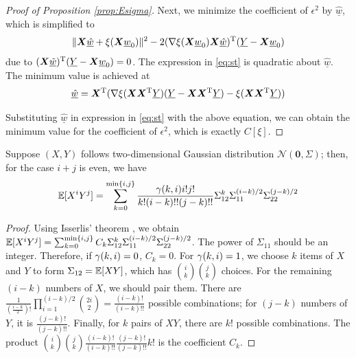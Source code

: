 \documentclass[appliedmath,article,accept,pdftex,moreauthors]{Definitions/mdpi}
\begin{document}
\begin{proof}[Proof of Proposition \ref{prop:Esigma}]
Next, we minimize the coefficient of $\epsilon^2$ by $\underline{\hat{w}}$, which is simplified to 
\begin{equation}\label{eq:st}
\lVert\bm{X}\underline{\hat{w}} + \xi(\bm{X} \underline{w}_0)\rVert^2-
2 (
\nabla \xi(\bm{X} \underline{w}_0)\bm{X}\underline{\hat{w}})^{\mathrm{T}}(\underline{Y}-\bm{X} \underline{w}_0)
\end{equation}
due to $(\bm{X}\underline{\tilde{w}})^{\mathrm{T}} (\underline{Y}-\bm{X}\underline{w}_0) = 0 $.
The expression in \eqref{eq:st} is quadratic about $\underline{\hat{w}}$. The minimum value is achieved  at
$$
\underline{\hat{w}} =  \bm{X}^{\mathrm{T}}(\nabla\xi(\bm{X}\bm{X}^{\mathrm{T}} \underline{Y})
(\underline{Y}-\bm{X}\bm{X}^{\mathrm{T}} \underline{Y}) - \xi(\bm{X}\bm{X}^{\mathrm{T}} \underline{Y}))
$$

{Substituting} $\underline{\hat{w}}$ in expression in \eqref{eq:st} with the above equation, we can obtain the minimum value for the coefficient of $\epsilon^2$, which is exactly $C[\xi]$.
\end{proof}
\begin{Lemma}\label{lemma:Isserlis2}
     Suppose $(X,Y)$ follows two-dimensional Gaussian distribution $\mathcal{N}(\bm{0}, \Sigma)$; then, for the case $i+j$ is even, we have
\begin{equation*}
    \mathbb{E}[X^i Y^j] =
    \sum_{k=0}^{\min\{i,j\}}
    \frac{\gamma(k,i) i! j!}{k! (i-k)!!(j-k)!!}
    \Sigma_{12}^k \Sigma_{11}^{(i-k)/2}\Sigma_{22}^{(j-k)/2}
\end{equation*}
\end{Lemma}
\begin{proof}
Using Isserlis' theorem \cite{isserlis1918formula}, we obtain
$  \mathbb{E}[X^i Y^j] = \sum_{k=0}^{\min\{i,j\}} C_k \Sigma_{12}^k \Sigma_{11}^{(i-k)/2}\Sigma_{22}^{(j-k)/2}$.
The power of $\Sigma_{11}$ should be an integer. Therefore, if $\gamma(k,i) = 0$, $C_k = 0$.
For $\gamma(k,i) = 1$, we choose $k$ items of $X$ and $Y$ to form $\Sigma_{12} = \mathbb{E}[XY]$, which has $\binom{i}{k}\binom{j}{k}$ choices.
For the remaining $(i-k)$ numbers of $X$, we should pair them. There are $\frac{1}{(\frac{i-k}{2})!}\prod_{i=1}^{(i-k)/2} \binom{2i}{2} = \frac{(i-k)!}{(i-k)!!}$ possible combinations; for $(j-k)$ numbers of $Y$, it is $\frac{(j-k)!}{(j-k)!!}$. Finally, for $k$ pairs of $XY$, there are $k!$ possible combinations. The product $\binom{i}{k}\binom{j}{k}\frac{(i-k)!}{(i-k)!!}\frac{(j-k)!}{(j-k)!!}k!$ is the coefficient $C_k$.
\end{proof}
\end{document}
